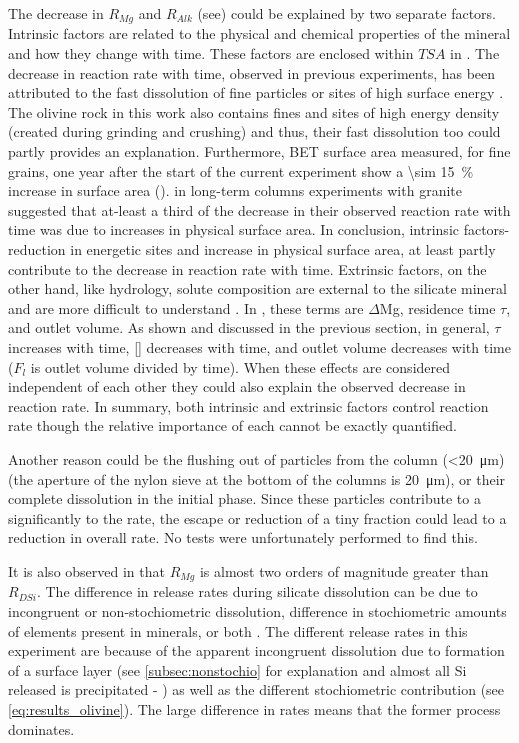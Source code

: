 The decrease in $R_{Mg}$ and $R_{Alk}$ (see) could be explained by two separate factors. Intrinsic factors are related to the physical and chemical properties of the mineral and how they change with time. These factors are enclosed within $TSA$ in . The decrease in reaction rate with time, observed in previous experiments, has been attributed to the fast dissolution of fine particles or sites of high surface energy \citep{Brantley2008b}. The olivine rock in this work also contains fines and sites of high energy density (created during grinding and crushing) and thus, their fast dissolution too could partly provides an explanation. Furthermore, BET surface area measured, for fine grains, one year after the start of the current experiment show a \SI{\sim 15}{\percent} increase in surface area (). \cite{white2003} in long-term columns experiments with granite suggested that at-least a third of the decrease in their observed reaction rate with time was due to increases in physical surface area. In conclusion, intrinsic factors- reduction in energetic sites and increase in physical surface area, at least partly contribute to the decrease in reaction rate with time. Extrinsic factors, on the other hand, like hydrology, solute composition are external to the silicate mineral and are more difficult to understand \citep{white2003}. In , these terms are $\Delta$Mg, residence time $\tau$, and outlet volume. As shown and discussed in the previous section, in general, $\tau$ increases with time, [] decreases with time, and outlet volume decreases with time ($F_l$ is outlet volume divided by time). When these effects are considered independent of each other they could also explain the observed decrease in reaction rate. In summary, both intrinsic and extrinsic factors control reaction rate though the relative importance of each cannot be exactly quantified.

Another reason could be the flushing out of particles from the column (\SI{<20}{\micro\metre}) (the aperture of the nylon sieve at the bottom of the columns is \SI{20}{\micro\metre}), or their complete dissolution in the initial phase. Since these particles contribute to a significantly to the rate, the escape or reduction of a tiny fraction could lead to a reduction in overall rate. No tests were unfortunately performed to find this. 

\noindent It is also observed in  that $R_{Mg}$ is almost two orders of magnitude greater than $R_{DSi}$.  The difference in release rates during silicate dissolution can be due to incongruent or non-stochiometric dissolution, difference in stochiometric amounts of elements present in minerals, or both \citep{rimstidt2012}. The different release rates in this experiment are because of the apparent incongruent dissolution due to formation of a surface layer (see \cref{subsec:nonstochio} for explanation and almost all Si released is precipitated - ) as well as the different stochiometric contribution (see \cref{eq:results_olivine}). The large difference in rates means that the former process dominates.

